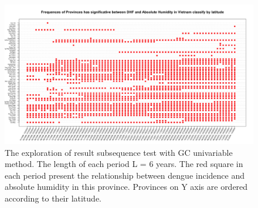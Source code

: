 \begin{figure}[h]
\begin{center}
\includegraphics[width = \linewidth]{../figures/annexe/lat_result_ah.png}
\caption{The exploration of result subsequence test with GC univariable method. The length of each period L = 6 years. The red square in each period present the relationship between dengue incidence and absolute humidity in this province. Provinces on Y axis are ordered according to their latitude. }
\label{expl_14}	
\end{center}
\end{figure}

